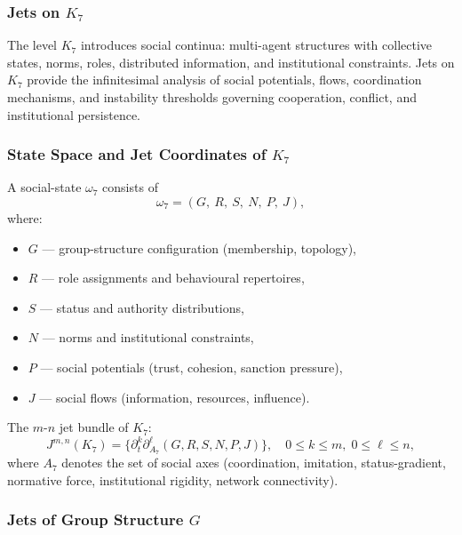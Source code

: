 
\subsubsection{Jets on \texorpdfstring{$K_7$}{K_7}}
\label{sec:jets-k7}

The level $K_7$ introduces social continua: multi-agent structures with
collective states, norms, roles, distributed information, and
institutional constraints. Jets on $K_7$ provide the infinitesimal
analysis of social potentials, flows, coordination mechanisms, and
instability thresholds governing cooperation, conflict, and institutional
persistence.


\subsubsection{State Space and Jet Coordinates of \texorpdfstring{$K_7$}{K_7}}

A social-state $\omega_7$ consists of
\[
\omega_7 =
(G,\ R,\ S,\ N,\ P,\ J),
\]
where:
\begin{itemize}
    \item $G$ — group-structure configuration (membership, topology),
    \item $R$ — role assignments and behavioural repertoires,
    \item $S$ — status and authority distributions,
    \item $N$ — norms and institutional constraints,
    \item $P$ — social potentials (trust, cohesion, sanction pressure),
    \item $J$ — social flows (information, resources, influence).
\end{itemize}

The $m$-$n$ jet bundle of $K_7$:
\[
J^{m,n}(K_7)
=
\big\{
\partial_t^k \partial_{A_7}^\ell (G,R,S,N,P,J)
\big\},
\quad
0\le k\le m,\; 0\le\ell\le n,
\]
where $A_7$ denotes the set of social axes (coordination, imitation,
status-gradient, normative force, institutional rigidity, network
connectivity).


\subsubsection{Jets of Group Structure \texorpdfstring{$G$}{G}}

